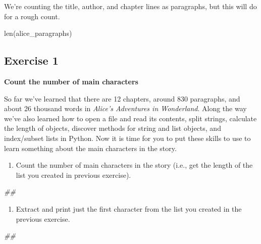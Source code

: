 \documentclass[
]{book}
\newenvironment{Shaded}{\begin{snugshade}}{\end{snugshade}}
\newcommand{\BuiltInTok}[1]{#1}
\newcommand{\CommentTok}[1]{\textcolor[rgb]{0.56,0.35,0.01}{\textit{#1}}}
\newcommand{\NormalTok}[1]{#1}
\providecommand{\tightlist}{%
  \setlength{\itemsep}{0pt}\setlength{\parskip}{0pt}}
\begin{document}
We're counting the title, author, and chapter lines as paragraphs, but this will do for a rough count.

\begin{Shaded}
\begin{Highlighting}[]
\BuiltInTok{len}\NormalTok{(alice_paragraphs)}
\end{Highlighting}
\end{Shaded}

\hypertarget{exercise-1-4}{%
\subsection{Exercise 1}\label{exercise-1-4}}

\textbf{Count the number of main characters}

So far we've learned that there are 12 chapters, around 830 paragraphs, and about 26 thousand words in \emph{Alice's Adventures in Wonderland}. Along the way we've also learned how to open a file and read its contents, split strings, calculate the length of objects, discover methods for string and list objects, and index/subset lists in Python. Now it is time for you to put these skills to use to learn something about the main characters in the story.

\begin{enumerate}
\def\labelenumi{\arabic{enumi}.}
\tightlist
\item
  Count the number of main characters in the story (i.e., get the length of the list you created in previous exercise).
\end{enumerate}

\begin{Shaded}
\begin{Highlighting}[]
\CommentTok{##}
\end{Highlighting}
\end{Shaded}

\begin{enumerate}
\def\labelenumi{\arabic{enumi}.}
\setcounter{enumi}{1}
\tightlist
\item
  Extract and print just the first character from the list you created in the previous exercise.
\end{enumerate}

\begin{Shaded}
\begin{Highlighting}[]
\CommentTok{##}
\end{Highlighting}
\end{Shaded}
\end{document}
